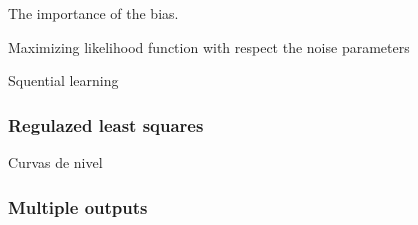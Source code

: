   
  \begin{frame}{The importance of the bias.}
  \end{frame}
  
  \begin{frame}{Maximizing likelihood function with respect the noise parameters}
    
  \end{frame}
  
  \begin{frame}{Squential learning} 
  \end{frame}
  
  \begin{frame}
    \frametitle{Regulazed least squares}
  Curvas de nivel
  \end{frame}
  
  \begin{frame}
    \frametitle{Multiple outputs}
  \end{frame}